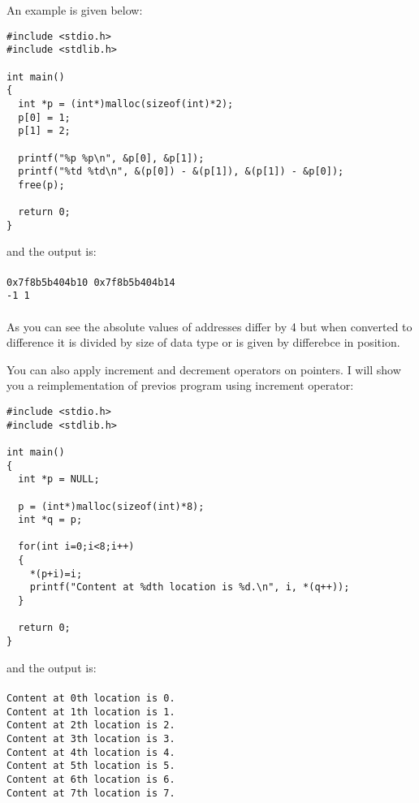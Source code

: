 An example is given below:

\begin{verbatim}
#include <stdio.h>
#include <stdlib.h>

int main()
{
  int *p = (int*)malloc(sizeof(int)*2);
  p[0] = 1;
  p[1] = 2;

  printf("%p %p\n", &p[0], &p[1]);
  printf("%td %td\n", &(p[0]) - &(p[1]), &(p[1]) - &p[0]);
  free(p);

  return 0;
}
\end{verbatim}
and the output is:
\\\\\texttt{0x7f8b5b404b10 0x7f8b5b404b14\\
-1 1\\\\}
As you can see the absolute values of addresses differ by 4 but when converted
to difference it is divided by size of data type or is given by differebce in
position.

You can also apply increment and decrement operators on pointers. I will show
you a reimplementation of previos program using increment operator:

\begin{verbatim}
#include <stdio.h>
#include <stdlib.h>

int main()
{
  int *p = NULL;

  p = (int*)malloc(sizeof(int)*8);
  int *q = p;

  for(int i=0;i<8;i++)
  {
    *(p+i)=i;
    printf("Content at %dth location is %d.\n", i, *(q++));
  }

  return 0;
}
\end{verbatim}
and the output is:
\\\\\texttt{Content at 0th location is 0.\\
Content at 1th location is 1.\\
Content at 2th location is 2.\\
Content at 3th location is 3.\\
Content at 4th location is 4.\\
Content at 5th location is 5.\\
Content at 6th location is 6.\\
Content at 7th location is 7.\\\\}

